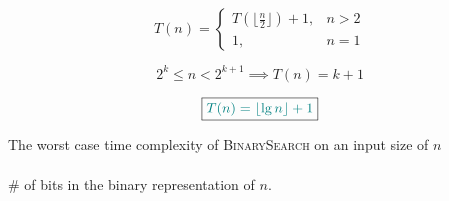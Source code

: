 \begin{frame}{}
  \[
    T(n) = \left\{\begin{array}{lr}
      T(\lfloor \frac{n}{2} \rfloor) + 1, & n > 2 \\
      1, & n = 1
    \end{array}\right.
  \]


  \pause
  \vspace{0.30cm}
  \[
    2^k \le n < 2^{k+1} \implies T(n) = k + 1
  \]

  \pause
  \vspace{0.30cm}
  \[
    \boxed{\textcolor{teal}{T(n) = \lfloor \lg n \rfloor + 1}}
  \]

  \pause
  \begin{theorem}
    \begin{center}
      The worst case time complexity of \textsc{BinarySearch} on an input size of $n$ \\
      \red{\bf $=$} \\
      \# of bits in the binary representation of $n$.
    \end{center}
  \end{theorem}
\end{frame}
